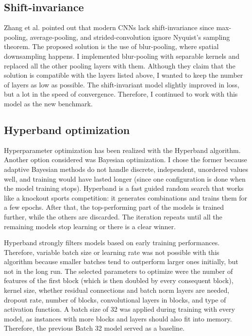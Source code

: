\subsection{Shift-invariance}

Zhang et al.\cite{Shift-Invariant} pointed out that modern CNNs lack shift-invariance since max-pooling, average-pooling, and strided-convolution ignore Nyquist's sampling theorem. The proposed solution is the use of blur-pooling, where spatial downsampling happens. I implemented blur-pooling with separable kernels and replaced all the other pooling layers with them. Although they claim that the solution is compatible with the layers listed above, I wanted to keep the number of layers as low as possible. The shift-invariant model slightly improved in loss, but a lot in the speed of convergence. Therefore, I continued to work with this model as the new benchmark.

\subsection{Hyperband optimization}

Hyperparameter optimization has been realized with the Hyperband algorithm\cite{Hyperband}. Another option considered was Bayesian optimization. I chose the former because adaptive Bayesian methods do not handle discrete, independent, unordered values well, and training would have lasted longer (since one configuration is done when the model training stops). Hyperband is a fast guided random search that works like a knockout sports competition: it generates combinations and trains them for a few epochs. After that, the top-performing part of the models is trained further, while the others are discarded. The iteration repeats until all the remaining models stop learning or there is a clear winner. 

Hyperband strongly filters models based on early training performances. Therefore, variable batch size or learning rate was not possible with this algorithm because smaller batches tend to outperform larger ones initially, but not in the long run. The selected parameters to optimize were the number of features of the first block (which is then doubled by every consequent block), kernel size, whether residual connections and batch norm layers are needed, dropout rate, number of blocks, convolutional layers in blocks, and type of activation function. A batch size of 32 was applied during training with every model, as instances with more blocks and layers should also fit into memory. Therefore, the previous Batch 32 model served as a baseline.

